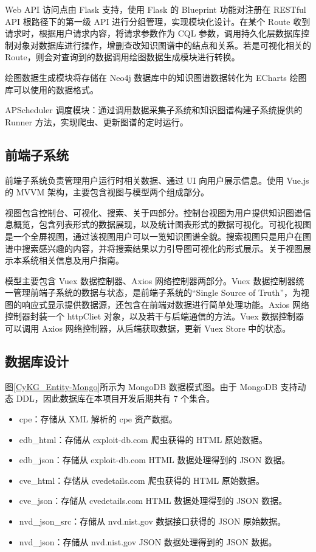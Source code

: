 \documentclass[a4paper,AutoFakeBold,oneside,12pt]{book}
\begin{document}
Web API 访问点由 Flask 支持，使用 Flask 的 Blueprint 功能对注册在 RESTful API 根路径下的第一级 API 进行分组管理，实现模块化设计。在某个 Route 收到请求时，根据用户请求内容，将请求参数作为 CQL 参数，调用持久化层数据库控制对象对数据库进行操作，增删查改知识图谱中的结点和关系。若是可视化相关的 Route，则会对查询到的数据调用绘图数据生成模块进行转换。

绘图数据生成模块将存储在 Neo4j 数据库中的知识图谱数据转化为 ECharts 绘图库可以使用的数据格式。

APScheduler 调度模块：通过调用数据采集子系统和知识图谱构建子系统提供的 Runner 方法，实现爬虫、更新图谱的定时运行。

\subsection{前端子系统}

前端子系统负责管理用户运行时相关数据、通过 UI 向用户展示信息。使用 Vue.js 的 MVVM 架构，主要包含视图与模型两个组成部分。

视图包含控制台、可视化、搜索、关于四部分。控制台视图为用户提供知识图谱信息概览，包含列表形式的数据展现，以及统计图表形式的数据可视化。可视化视图是一个全屏视图，通过该视图用户可以一览知识图谱全貌。搜索视图只是用户在图谱中搜索感兴趣的内容，并将搜索结果以力引导图可视化的形式展示。关于视图展示本系统相关信息及用户指南。

模型主要包含 Vuex 数据控制器、Axios 网络控制器两部分。Vuex 数据控制器统一管理前端子系统的数据与状态，是前端子系统的“Single Source of Truth”，为视图的响应式显示提供数据源，还包含在前端对数据进行简单处理功能。Axios 网络控制器封装一个 httpCliet 对象，以及若干与后端通信的方法。Vuex 数据控制器可以调用 Axios 网络控制器，从后端获取数据，更新 Vuex Store 中的状态。

\subsection{数据库设计}

图\ref{CyKG_Entity-Mongo}所示为 MongoDB 数据模式图。由于 MongoDB 支持动态 DDL，因此数据库在本项目开发后期共有 7 个集合。
\begin{itemize}
	\item cpe：存储从 XML 解析的 cpe 资产数据。
	\item edb{\_}html：存储从 exploit-db.com 爬虫获得的 HTML 原始数据。
	\item edb{\_}json：存储从 exploit-db.com HTML 数据处理得到的 JSON 数据。
	\item cve{\_}html：存储从 cvedetails.com 爬虫获得的 HTML 原始数据。
	\item cve{\_}json：存储从 cvedetails.com HTML 数据处理得到的 JSON 数据。
	\item nvd{\_}json{\_}src：存储从 nvd.nist.gov 数据接口获得的 JSON 原始数据。
	\item nvd{\_}json：存储从 nvd.nist.gov JSON 数据处理得到的 JSON 数据。
\end{itemize}
\end{document}
